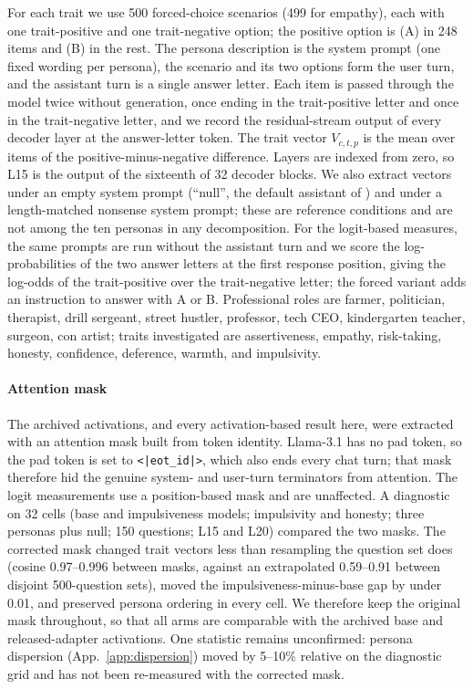 \documentclass[11pt]{article}
\begin{document}
\begin{llmblock}
For each trait we use 500 forced-choice scenarios (499 for empathy), each with one trait-positive and one trait-negative option; the positive option is (A) in 248 items and (B) in the rest. The persona description is the system prompt (one fixed wording per persona), the scenario and its two options form the user turn, and the assistant turn is a single answer letter. Each item is passed through the model twice without generation, once ending in the trait-positive letter and once in the trait-negative letter, and we record the residual-stream output of every decoder layer at the answer-letter token. The trait vector $V_{c,t,p}$ is the mean over items of the positive-minus-negative difference. Layers are indexed from zero, so L15 is the output of the sixteenth of 32 decoder blocks. We also extract vectors under an empty system prompt (``null'', the default assistant of \citet{lu2026assistant}) and under a length-matched nonsense system prompt; these are reference conditions and are not among the ten personas in any decomposition. For the logit-based measures, the same prompts are run without the assistant turn and we score the log-probabilities of the two answer letters at the first response position, giving the log-odds of the trait-positive over the trait-negative letter; the forced variant adds an instruction to answer with A or B. Professional roles are farmer, politician, therapist, drill sergeant, street hustler, professor, tech CEO, kindergarten teacher, surgeon, con artist; traits investigated are assertiveness, empathy, risk-taking, honesty, confidence, deference, warmth, and impulsivity.

\paragraph{Attention mask}
The archived activations, and every activation-based result here, were extracted with an attention mask built from token identity. Llama-3.1 has no pad token, so the pad token is set to \texttt{<|eot\_id|>}, which also ends every chat turn; that mask therefore hid the genuine system- and user-turn terminators from attention. The logit measurements use a position-based mask and are unaffected. A diagnostic on 32 cells (base and impulsiveness models; impulsivity and honesty; three personas plus null; 150 questions; L15 and L20) compared the two masks. The corrected mask changed trait vectors less than resampling the question set does (cosine 0.97--0.996 between masks, against an extrapolated 0.59--0.91 between disjoint 500-question sets), moved the impulsiveness-minus-base gap by under 0.01, and preserved persona ordering in every cell. We therefore keep the original mask throughout, so that all arms are comparable with the archived base and released-adapter activations. One statistic remains unconfirmed: persona dispersion (App.~\ref{app:dispersion}) moved by 5--10\% relative on the diagnostic grid and has not been re-measured with the corrected mask.


\end{llmblock}
\end{document}
